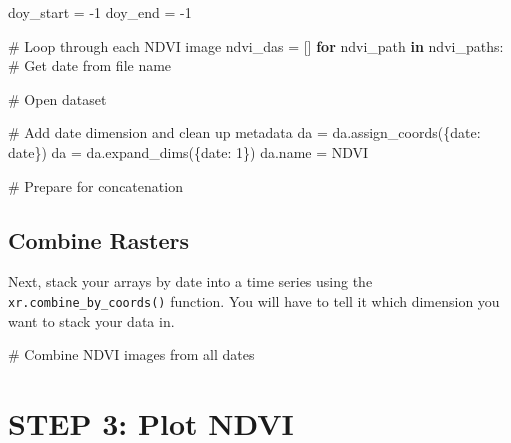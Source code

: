 \documentclass[
  letterpaper,
  DIV=11,
  numbers=noendperiod,
  oneside]{scrreprt}
\newenvironment{Shaded}{\begin{snugshade}}{\end{snugshade}}
\newcommand{\CommentTok}[1]{\textcolor[rgb]{0.37,0.37,0.37}{#1}}
\newcommand{\ControlFlowTok}[1]{\textcolor[rgb]{0.00,0.23,0.31}{\textbf{#1}}}
\newcommand{\DecValTok}[1]{\textcolor[rgb]{0.68,0.00,0.00}{#1}}
\newcommand{\KeywordTok}[1]{\textcolor[rgb]{0.00,0.23,0.31}{\textbf{#1}}}
\newcommand{\NormalTok}[1]{\textcolor[rgb]{0.00,0.23,0.31}{#1}}
\newcommand{\OperatorTok}[1]{\textcolor[rgb]{0.37,0.37,0.37}{#1}}
\newcommand{\StringTok}[1]{\textcolor[rgb]{0.13,0.47,0.30}{#1}}
\begin{document}
\begin{Shaded}
\begin{Highlighting}[]
\NormalTok{doy\_start }\OperatorTok{=} \OperatorTok{{-}}\DecValTok{1}
\NormalTok{doy\_end }\OperatorTok{=} \OperatorTok{{-}}\DecValTok{1}

\CommentTok{\# Loop through each NDVI image}
\NormalTok{ndvi\_das }\OperatorTok{=}\NormalTok{ []}
\ControlFlowTok{for}\NormalTok{ ndvi\_path }\KeywordTok{in}\NormalTok{ ndvi\_paths:}
    \CommentTok{\# Get date from file name}

    \CommentTok{\# Open dataset}

    \CommentTok{\# Add date dimension and clean up metadata}
\NormalTok{    da }\OperatorTok{=}\NormalTok{ da.assign\_coords(\{}\StringTok{\textquotesingle{}date\textquotesingle{}}\NormalTok{: date\})}
\NormalTok{    da }\OperatorTok{=}\NormalTok{ da.expand\_dims(\{}\StringTok{\textquotesingle{}date\textquotesingle{}}\NormalTok{: }\DecValTok{1}\NormalTok{\})}
\NormalTok{    da.name }\OperatorTok{=} \StringTok{\textquotesingle{}NDVI\textquotesingle{}}

    \CommentTok{\# Prepare for concatenation}
\end{Highlighting}
\end{Shaded}

\section{Combine Rasters}\label{combine-rasters-1}

Next, stack your arrays by date into a time series using the
\texttt{xr.combine\_by\_coords()} function. You will have to tell it
which dimension you want to stack your data in.

\begin{Shaded}
\begin{Highlighting}[]
\CommentTok{\# Combine NDVI images from all dates}
\end{Highlighting}
\end{Shaded}


\chapter{STEP 3: Plot NDVI}\label{step-3-plot-ndvi-1}
\end{document}

